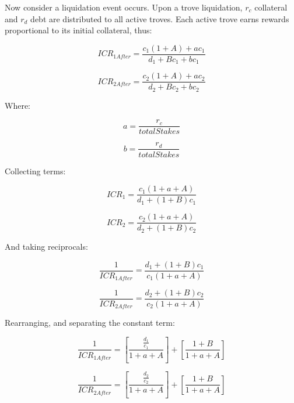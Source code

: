 \documentclass[reqno]{article}
\begin{document}
Now consider a liquidation event occurs. Upon a trove liquidation, $r_c$ collateral and $r_d$ debt are distributed to all active troves. Each active trove earns rewards proportional to its initial collateral, thus:

\begin{equation} 
    ICR_{1After}=\frac{c_1\left(1+A\right)+ac_1}{d_1+Bc_1+bc_1}
\end{equation}

\begin{equation} 
    ICR_{2After}=\frac{c_2\left(1+A\right)+ac_2}{d_2+Bc_2+bc_2}
\end{equation}

\bigskip
Where:

\begin{equation} 
    a=\frac{r_c}{totalStakes}
\end{equation}

\begin{equation} 
    b=\frac{r_d}{totalStakes}
\end{equation}

\bigskip
Collecting terms:

\begin{equation} 
    ICR_1=\frac{c_1\left(1+a+A\right)}{d_1+\left(1+B\right)c_1}
\end{equation}

\begin{equation} 
    ICR_2=\frac{c_2\left(1+a+A\right)}{d_2+\left(1+B\right)c_2}
\end{equation}

\bigskip
And taking reciprocals:

\begin{equation} 
    \frac{1}{ICR_{1After}}=\frac{d_1+\left(1+B\right)c_1}{c_1\left(1+a+A\right)}
\end{equation}

\begin{equation} 
    \frac{1}{ICR_{2After}}=\frac{d_2+\left(1+B\right)c_2}{c_2\left(1+a+A\right)}
\end{equation}

\bigskip
Rearranging, and separating the constant term:

\begin{equation} 
    \frac{1}{ICR_{1After}}=\left[\frac{\frac{d_1}{c_1}}{1+a+A}\right]+\left[\frac{1+B}{1+a+A}\right]
\end{equation}

\begin{equation} 
    \frac{1}{ICR_{2After}}=\left[\frac{\frac{d_2}{c_2}}{1+a+A}\right]+\left[\frac{1+B}{1+a+A}\right]
\end{equation}
\end{document}
